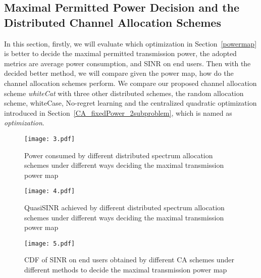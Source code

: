 \subsection{Maximal Permitted Power Decision and the Distributed Channel Allocation Schemes}
In this section, firstly, we will evaluate which optimization in Section~\ref{powermap} is better to decide the maximal permitted transmission power, the adopted metrics are average power consumption, and SINR on end users.
Then with the decided better method, we will compare given the power map, how do the channel allocation schemes perform.
We compare our proposed channel allocation scheme \textit{whiteCat} with three other distributed schemes, the random allocation scheme, whiteCase, No-regret learning and the centralized quadratic optimization introduced in Section~\ref{CA_fixedPower_2subproblem}, which is named as \textit{optimization}.


 \begin{figure}[h!]
    \centering
      \texttt{[image: 3.pdf]}
    \caption{Power consumed by different distributed spectrum allocation schemes under different ways deciding the maximal transmission power map}
\label{sim:group1_power}    
  \end{figure}
  
   \begin{figure}[h!]
       \centering
       \texttt{[image: 4.pdf]}
       \caption{QuasiSINR achieved by different distributed spectrum allocation schemes under different ways deciding the maximal transmission power map}
	\label{sim:group1_qsinr}       
     \end{figure}
  
 
  \begin{figure}[h!]
     \centering
     \texttt{[image: 5.pdf]}
     \caption{CDF of SINR on end users obtained by different CA schemes under different methods to decide the maximal transmission power map}
\label{group1_sinr}     
   \end{figure}


